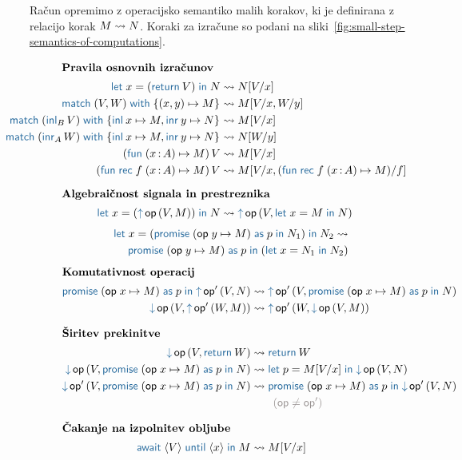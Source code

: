 Račun \lae{} opremimo z operacijsko semantiko malih korakov, ki je definirana z relacijo korak $M \leadsto N$. Koraki za izračune so podani na sliki~\ref{fig:small-step-semantics-of-computations}. 

\begin{figure}[H]
	\centering
	\small
	\begin{align*}
	\intertext{\textbf{Pravila osnovnih izračunov}}
	\tmlet{x}{(\tmreturn V)}{N} &\reduces N[V/x]
	\\
	\tmmatch{\tmpair{V}{W}}{\tmpair{x}{y} \mapsto M} &\reduces M[V/x, W/y]
	\\
	\mathllap{\tmmatch{(\tminl[B]{V})}{\tminl{x} \mapsto M, \tminr{y} \mapsto N}} &\reduces	M[V/x]
	\\
	\mathllap{\tmmatch{(\tminr[A]{W})}{\tminl{x} \mapsto M, \tminr{y} \mapsto N}} &\reduces	N[W/y]
	\\
	\tmapp{(\tmfun{x \of A}{M})}{V} &\reduces M[V/x]
	\\
	\tmapp{(\tmfunrec{f}{x \of A}{M})}{V} &\reduces M[V/x, (\tmfunrec{f}{x \of A}{M})/f]
	\\[1ex]
	\intertext{\textbf{Algebraičnost signala in prestreznika}}
	\tmlet{x}{(\tmopout{op}{V}{M})}{N} &\reduces \tmopout{op}{V}{\tmlet{x}{M}{N}}
	\end{align*}
	\vspace{-6ex}
	\begin{align*}
	\tmlet{x}{(\tmwith{op}{y}{M}{p}{N_1})}{N_2} \reduces \\
	\tmwith{op}{y}{M}{p}{(\tmlet{x}{N_1}{N_2})}
	\end{align*}
	\vspace{-6ex}
	\begin{align*}
	\intertext{\textbf{Komutativnost operacij}}
	\tmwith{op}{x}{M}{p}{\tmopout{op'}{V}{N}} &\reduces \tmopout{op'}{V}{\tmwith{op}{x}{M}{p}{N}}
	\\
	\tmopin{op}{V}{\tmopout{op'}{W}{M}} &\reduces \tmopout{op'}{W}{\tmopin{op}{V}{M}}
	\\[1ex]
	\intertext{\textbf{Širitev prekinitve}}
	\tmopin{op}{V}{\tmreturn W} &\reduces \tmreturn W
	\\
	\tmopin{op}{V}{\tmwith{op}{x}{M}{p}{N}} &\reduces \tmlet{p}{M[V/x]}{\tmopin{op}{V}{N}}
	\\
	\tmopin{op'}{V}{\tmwith{op}{x}{M}{p}{N}} &\reduces \tmwith{op}{x}{M}{p}{\tmopin{op'}{V}{N}} \\
	&\qquad {\color{rulenameColor}(\op \neq \op')}
	\\[1ex]
	\intertext{\textbf{Čakanje na izpolnitev obljube}}
	\tmawait{\tmpromise V}{x}{M} &\reduces M[V/x]
	\end{align*}
	

\end{figure}
